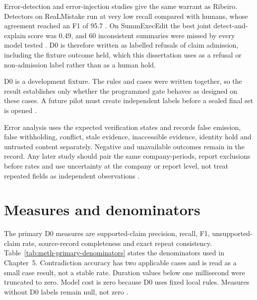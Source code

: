 Error-detection and error-injection studies give the same warrant as Ribeiro. Detectors on
ReaLMistake run at very low recall compared with humans, whose agreement reached an F1 of 95.7
\citep{kamoi2024realmistake,ribeiro2020checklist}. On SummExecEdit the best joint detect-and-explain
score was 0.49, and 60 inconsistent summaries were missed by every model tested
\citep{thorat2024summexecedit,kamoi2024realmistake}. D0 is therefore written as labelled refusals of
claim admission, including the fixture outcome held, which this dissertation uses as a refusal or
non-admission label rather than as a human hold.

D0 is a development fixture. The rules and cases were written together, so the result establishes
only whether the programmed gate behaves as designed on these cases. A future pilot must create
independent labels before a sealed final set is opened \citep{kapoor2023leakage,pineau2021reproducibility}.

Error analysis uses the expected verification states and records false emission, false withholding,
conflict, stale evidence, inaccessible evidence, identity hold and untrusted content separately.
Negative and unavailable outcomes remain in the record. Any later study should pair the same
company-periods, report exclusions before rates and use uncertainty at the company or report level,
not treat repeated fields as independent observations
\citep{kapoor2023leakage,pineau2021reproducibility}.

\section{Measures and denominators}

The primary D0 measures are supported-claim precision, recall, F1, unsupported-claim rate,
source-record completeness and exact repeat consistency. Table~\ref{tab:meth-primary-denominators}
states the denominators used in Chapter~5. Contradiction accuracy has two applicable cases and is
read as a small case result, not a stable rate. Duration values below one millisecond were truncated
to zero. Model cost is zero because D0 uses fixed local rules. Measures without D0 labels remain
null, not zero \citep{gao2023alce,nikiforova2020quality}.



